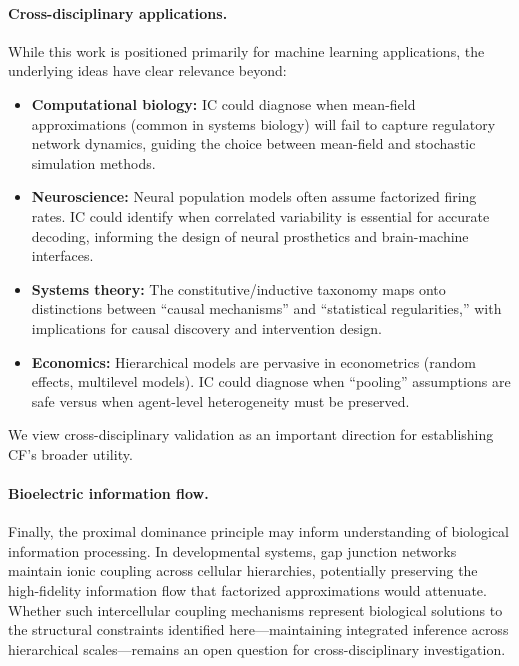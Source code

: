 \documentclass[10pt]{article} %
\theoremstyle{plain}
\theoremstyle{definition}
\begin{document}
\paragraph{Cross-disciplinary applications.} While this work is positioned primarily for machine learning applications, the underlying ideas have clear relevance beyond:
\begin{itemize}
    \item \textbf{Computational biology:} IC could diagnose when mean-field approximations (common in systems biology) will fail to capture regulatory network dynamics, guiding the choice between mean-field and stochastic simulation methods.
    \item \textbf{Neuroscience:} Neural population models often assume factorized firing rates. IC could identify when correlated variability is essential for accurate decoding, informing the design of neural prosthetics and brain-machine interfaces.
    \item \textbf{Systems theory:} The constitutive/inductive taxonomy maps onto distinctions between ``causal mechanisms'' and ``statistical regularities,'' with implications for causal discovery and intervention design.
    \item \textbf{Economics:} Hierarchical models are pervasive in econometrics (random effects, multilevel models). IC could diagnose when ``pooling'' assumptions are safe versus when agent-level heterogeneity must be preserved.
\end{itemize}
We view cross-disciplinary validation as an important direction for establishing CF's broader utility.

\paragraph{Bioelectric information flow.} Finally, the proximal dominance principle may inform understanding of biological information processing. In developmental systems, gap junction networks maintain ionic coupling across cellular hierarchies, potentially preserving the high-fidelity information flow that factorized approximations would attenuate. Whether such intercellular coupling mechanisms represent biological solutions to the structural constraints identified here---maintaining integrated inference across hierarchical scales---remains an open question for cross-disciplinary investigation.
\end{document}
